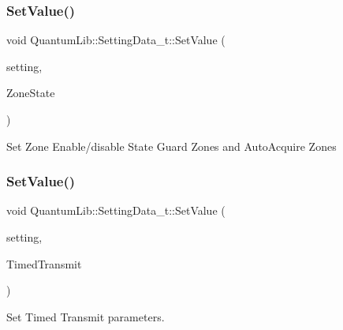 \subsubsection{\texorpdfstring{Set\+Value()}{SetValue()}\hspace{0.1cm}{\footnotesize\ttfamily [7/26]}}
{\footnotesize\ttfamily void Quantum\+Lib\+::\+Setting\+Data\+\_\+t\+::\+Set\+Value (\begin{DoxyParamCaption}\item[{\mbox{\hyperlink{namespace_quantum_lib_acc8124e3e65bca4aa798d03a55e3d54c}{e\+Settings\+\_\+t}}}]{setting,  }\item[{\mbox{\hyperlink{struct_quantum_lib_1_1_zone_state__t}{Zone\+State\+\_\+t}}}]{Zone\+State }\end{DoxyParamCaption})\hspace{0.3cm}{\ttfamily [inline]}}

Set Zone Enable/disable State Guard Zones and Auto\+Acquire Zones \mbox{\label{struct_quantum_lib_1_1_setting_data__t_a0ab8eb9c1f7f021ed505e717cdfa3dec}} 
\subsubsection{\texorpdfstring{Set\+Value()}{SetValue()}\hspace{0.1cm}{\footnotesize\ttfamily [8/26]}}
{\footnotesize\ttfamily void Quantum\+Lib\+::\+Setting\+Data\+\_\+t\+::\+Set\+Value (\begin{DoxyParamCaption}\item[{\mbox{\hyperlink{namespace_quantum_lib_acc8124e3e65bca4aa798d03a55e3d54c}{e\+Settings\+\_\+t}}}]{setting,  }\item[{\mbox{\hyperlink{struct_quantum_lib_1_1_timed_transmit__t}{Timed\+Transmit\+\_\+t}} \&}]{Timed\+Transmit }\end{DoxyParamCaption})\hspace{0.3cm}{\ttfamily [inline]}}



Set Timed Transmit parameters. 

\mbox{\label{struct_quantum_lib_1_1_setting_data__t_abaf2b3d8b13e25f2e1873a196aa2be74}} 
